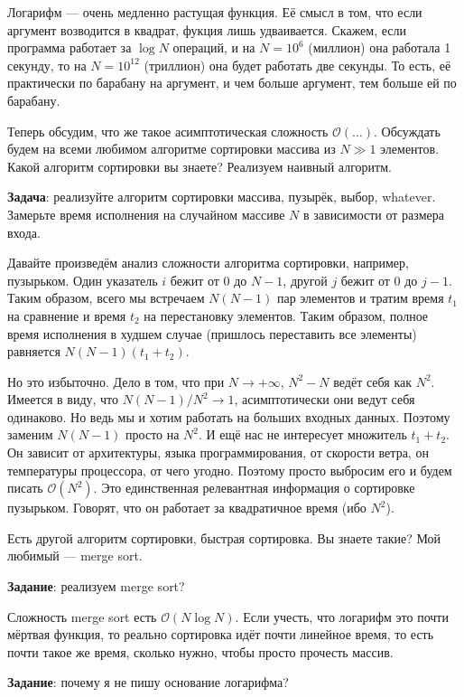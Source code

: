 \documentclass[12pt]{article}
\begin{document}
Логарифм --- очень медленно растущая функция. Её смысл в том, что если аргумент возводится в квадрат, фукция лишь удваивается. Скажем, если программа работает за $\log N$ операций, и на $N = 10^6$ (миллион) она работала 1 секунду, то на $N = 10^{12}$ (триллион) она будет работать две секунды. То есть, её практически по барабану на аргумент, и чем больше аргумент, тем больше ей по барабану.

Теперь обсудим, что же такое асимптотическая сложность $\mathcal{O}(\ldots)$. Обсуждать будем на всеми любимом алгоритме сортировки массива из $N \gg 1$ элементов. Какой алгоритм сортировки вы знаете? Реализуем наивный алгоритм.

{\bf Задача}: реализуйте алгоритм сортировки массива, пузырёк, выбор, whatever. Замерьте время исполнения на случайном массиве $N$ в зависимости от размера входа. 

Давайте произведём анализ сложности алгоритма сортировки, например, пузырьком. Один указатель $i$ бежит от $0$ до $N - 1$, другой $j$ бежит от $0$ до $j - 1$. Таким образом, всего мы встречаем $N (N - 1)$ пар элементов и тратим время $t_1$ на сравнение и время $t_2$ на перестановку элементов. Таким образом, полное время исполнения в худшем случае (пришлось переставить все элементы) равняется $N(N - 1) (t_1 + t_2)$.

Но это избыточно. Дело в том, что при $N \to +\infty$, $N^2 - N$ ведёт себя как $N^2$. Имеется в виду, что $N (N - 1) / N^2 \to 1$, асимптотически они ведут себя одинаково. Но ведь мы и хотим работать на больших входных данных. Поэтому заменим $N (N - 1)$ просто на $N^2$. И ещё нас не интересует множитель $t_1 + t_2$. Он зависит от архитектуры, языка программирования, от скорости ветра, он температуры процессора, от чего угодно. Поэтому просто выбросим его и будем писать $\mathcal{O}(N^2)$. Это единственная релевантная информация о сортировке пузырьком. Говорят, что он работает за квадратичное время (ибо $N^2$).

Есть другой алгоритм сортировки, быстрая сортировка. Вы знаете такие? Мой любимый --- merge sort.

{\bf Задание}: реализуем merge sort?

Сложность merge sort есть $\mathcal{O}(N \log N)$. Если учесть, что логарифм это почти мёртвая функция, то реально сортировка идёт почти линейное время, то есть почти такое же время, сколько нужно, чтобы просто прочесть массив. 

{\bf Задание}: почему я не пишу основание логарифма?
\end{document}
